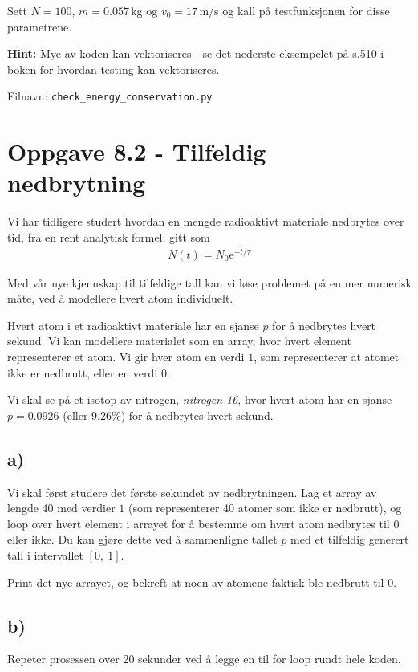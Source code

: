 \documentclass[10pt,a4paper]{article}
\renewcommand{\exp}{\mathrm{e}^}
\begin{document}
Sett $N = 100$, $m = 0.057\,$kg og $v_0 = 17\,$m/s og kall på testfunksjonen for disse parametrene. 
 
\textbf{Hint:} Mye av koden kan vektoriseres - se det nederste eksempelet på s.510 i boken  for hvordan testing kan vektoriseres. 
 
Filnavn: \texttt{check\_energy\_conservation.py}



\section*{Oppgave 8.2 - Tilfeldig nedbrytning}
Vi har tidligere studert hvordan en mengde radioaktivt materiale nedbrytes over tid, fra en rent analytisk formel, gitt som
\begin{align}
N(t) = N_0\exp{-t/\tau}
\label{eqn:8.2}
\end{align}
 
Med vår nye kjennskap til tilfeldige tall kan vi løse problemet på en mer numerisk måte, ved å modellere hvert atom individuelt.
 
Hvert atom i et radioaktivt materiale har en sjanse $p$ for å nedbrytes hvert sekund. Vi kan modellere materialet som en array, hvor hvert element representerer et atom. Vi gir hver atom en verdi $1$, som representerer at atomet ikke er nedbrutt, eller en verdi $0$.
 
Vi skal se på et isotop av nitrogen, \textit{nitrogen-16}, hvor hvert atom har en sjanse $p = 0.0926$ (eller $9.26\%$) for å nedbrytes hvert sekund.
 
\subsection*{a)}
Vi skal først studere det første sekundet av nedbrytningen. Lag et array av lengde 40 med verdier $1$ (som representerer 40 atomer som ikke er nedbrutt), og loop over hvert element i arrayet for å bestemme om hvert atom nedbrytes til $0$ eller ikke. Du kan gjøre dette ved å sammenligne tallet $p$ med et tilfeldig generert tall i intervallet $[0,\ 1]$.
 
Print det nye arrayet, og bekreft at noen av atomene faktisk ble nedbrutt til $0$.
 
\subsection*{b)}
Repeter prosessen over 20 sekunder ved å legge en til for loop rundt hele koden.
 
\end{document}
